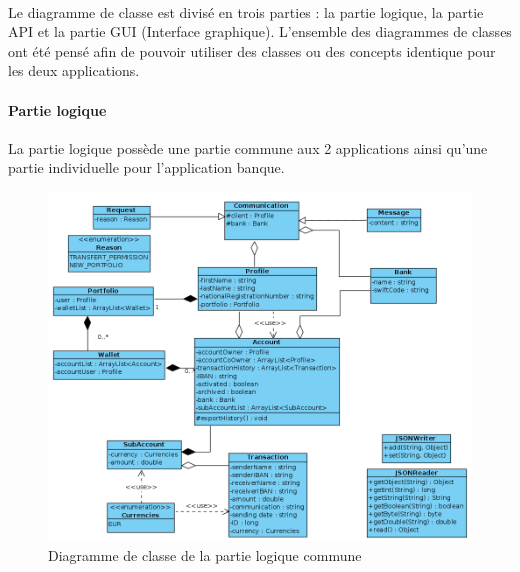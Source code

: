\paragraph{}Le diagramme de classe est divisé en trois parties : la partie logique, la partie API et la partie GUI (Interface graphique). L'ensemble des diagrammes de classes ont été pensé afin de pouvoir utiliser des classes ou des concepts identique pour les deux applications.

    \paragraph{Partie logique}
    La partie logique possède une partie commune aux 2 applications ainsi qu'une partie individuelle pour l’application banque.

    \begin{figure}[ht]
    \centering
    \includegraphics[scale=0.35]{img/ClassCommonPart.png}
    \caption{Diagramme de classe de la partie logique commune}
    \label{fig1}
    \end{figure}

